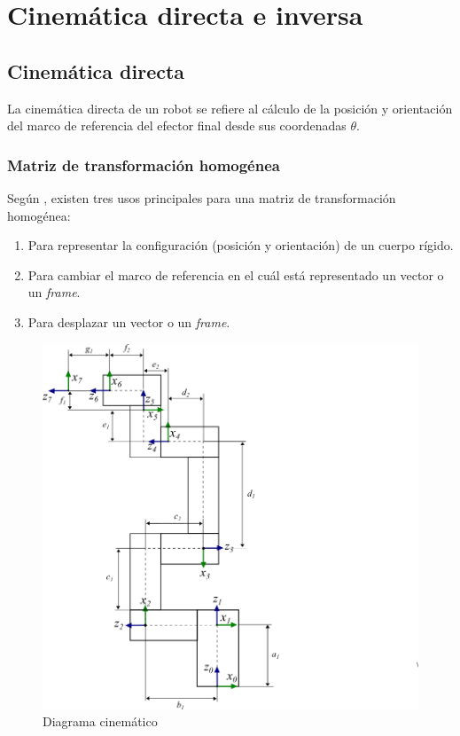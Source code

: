 \section{Cinemática directa e inversa}
\subsection{Cinemática directa}

La cinemática directa de un robot se refiere al cálculo de la posición y orientación del marco de referencia del efector final desde sus coordenadas $\theta$. \cite{University2017}

\subsubsection{Matriz de transformación homogénea}

Según \cite{University2017}, existen tres usos principales para una matriz de transformación homogénea:

\begin{enumerate}
  \item Para representar la configuración (posición y orientación) de un cuerpo rígido.
  \item Para cambiar el marco de referencia en el cuál está representado un vector o un \textit{frame}.
  \item Para desplazar un vector o un \textit{frame}.
\end{enumerate}

\begin{figure}
    \centering
    \includegraphics[scale=0.7]{./img/chapter4/kinematicdiagram.png}
    \caption{Diagrama cinemático}
    \label{fig:kinematicchain}
\end{figure}

